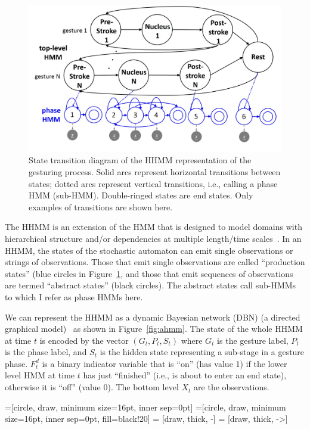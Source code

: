 \begin{figure}[tbh]
\centering
\includegraphics[width=\columnwidth]{figures/hhmm.jpg}
\caption{State transition diagram of the HHMM representation of the
gesturing process.
Solid arcs represent horizontal transitions between states; dotted arcs
represent vertical transitions, i.e., calling a phase HMM (sub-HMM).
Double-ringed states are end states. Only examples of transitions are shown
here.}
\label{fig:hhmm}
\end{figure}

The HHMM is an extension of the HMM that is designed to model domains with
hierarchical structure and/or dependencies at multiple length/time
scales~\cite{murphy02}. In an HHMM, the states of the stochastic automaton can
emit single observations or strings of observations. Those that emit single
observations are called ``production states'' (blue circles in
Figure~\ref{fig:hhmm}, and those that emit sequences of observations are termed
``abstract states'' (black circles). The abstract states call sub-HMMs to which
I refer as phase HMMs here.

We can represent the HHMM as a dynamic Bayesian network (DBN) (a
directed graphical model)~\cite{murphy02} as shown in Figure~\ref{fig:ahmm}.
The state of the whole HHMM at time $t$ is encoded by the vector $(G_t, P_t, S_t)$ where $G_t$ is the gesture label, $P_t$ is the
phase label, and $S_t$ is the hidden state representing a sub-stage in a
gesture phase. $F_t^d$ is a binary indicator variable that is
``on'' (has value 1) if the lower level HMM at time $t$ has just ``finished''
(i.e., is about to enter an end state), otherwise it is ``off'' (value 0).
The bottom level $X_t$ are the observations. 

=[circle, draw, minimum size=16pt, inner sep=0pt]
=[circle, draw, minimum size=16pt, inner sep=0pt,
               fill=black!20] 
 = [draw, thick, -]
 = [draw, thick, ->]

